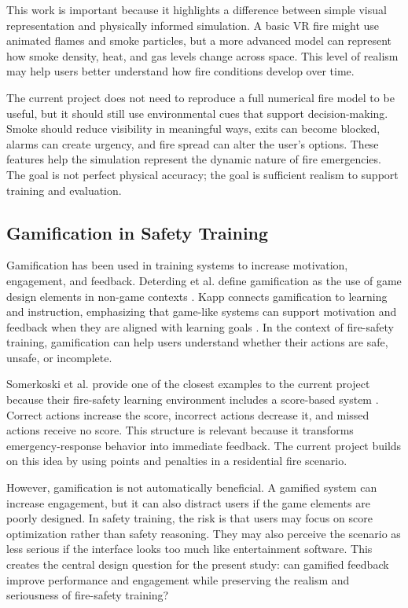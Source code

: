 \documentclass[manuscript, review]{acmart}
\begin{document}
{This work is important because it highlights a difference between simple visual representation and physically informed simulation. A basic VR fire might use animated flames and smoke particles, but a more advanced model can represent how smoke density, heat, and gas levels change across space. This level of realism may help users better understand how fire conditions develop over time.

The current project does not need to reproduce a full numerical fire model to be useful, but it should still use environmental cues that support decision-making. Smoke should reduce visibility in meaningful ways, exits can become blocked, alarms can create urgency, and fire spread can alter the user's options. These features help the simulation represent the dynamic nature of fire emergencies. The goal is not perfect physical accuracy; the goal is sufficient realism to support training and evaluation.

\subsection{Gamification in Safety Training}

Gamification has been used in training systems to increase motivation, engagement, and feedback. Deterding et al. define gamification as the use of game design elements in non-game contexts \cite{deterding2011gamification}. Kapp connects gamification to learning and instruction, emphasizing that game-like systems can support motivation and feedback when they are aligned with learning goals \cite{kapp2012gamification}. In the context of fire-safety training, gamification can help users understand whether their actions are safe, unsafe, or incomplete.

Somerkoski et al. provide one of the closest examples to the current project because their fire-safety learning environment includes a score-based system \cite{somerkoski2020digital}. Correct actions increase the score, incorrect actions decrease it, and missed actions receive no score. This structure is relevant because it transforms emergency-response behavior into immediate feedback. The current project builds on this idea by using points and penalties in a residential fire scenario.

However, gamification is not automatically beneficial. A gamified system can increase engagement, but it can also distract users if the game elements are poorly designed. In safety training, the risk is that users may focus on score optimization rather than safety reasoning. They may also perceive the scenario as less serious if the interface looks too much like entertainment software. This creates the central design question for the present study: can gamified feedback improve performance and engagement while preserving the realism and seriousness of fire-safety training?

}
\end{document}
